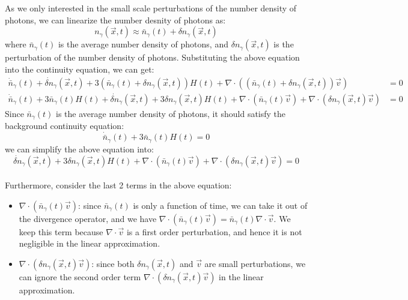 \bigskip \noindent
\begin{foundation}
    As we only interested in the small scale perturbations of the number density of photons, we can linearize the number desnity of photons as:
    \[
        n_\gamma(\vec{x},t) \approx \bar{n}_\gamma(t) + \delta n_\gamma(\vec{x},t)
    \]
    where $\bar{n}_\gamma(t)$ is the average number density of photons, and $\delta n_\gamma(\vec{x},t)$ is the perturbation of the number density of photons. Substituting the above equation into the continuity equation, we can get:
    \small
    \begin{align*}
        \dot{\bar{n}}_\gamma(t) + \dot{\delta n}_\gamma(\vec{x},t) + 3 (\bar{n}_\gamma(t) + \delta n_\gamma(\vec{x},t)) H(t) + \nabla \cdot ((\bar{n}_\gamma(t) + \delta n_\gamma(\vec{x},t)) \vec{v}) &= 0 \\
        \dot{\bar{n}}_\gamma(t) + 3 \bar{n}_\gamma(t) H(t) + \dot{\delta n}_\gamma(\vec{x},t)   + 3 \delta n_\gamma(\vec{x},t) H(t) + \nabla \cdot (\bar{n}_\gamma(t) \vec{v}) + \nabla \cdot (\delta n_\gamma(\vec{x},t) \vec{v}) &= 0
    \end{align*}
    \normalsize
    Since $\bar{n}_\gamma(t)$ is the average number density of photons, it should satisfy the background continuity equation:
    \[
        \dot{\bar{n}}_\gamma(t) + 3 \bar{n}_\gamma(t) H(t) = 0
    \]
    we can simplify the above equation into:
    \[
        \dot{\delta n}_\gamma(\vec{x},t) + 3 \delta n_\gamma(\vec{x},t) H(t) + \nabla \cdot (\bar{n}_\gamma(t) \vec{v}) + \nabla \cdot (\delta n_\gamma(\vec{x},t) \vec{v}) = 0 
    \] \\

    Furthermore, consider the last 2 terms in the above equation:
    \begin{itemize}
        \item $\nabla \cdot (\bar{n}_\gamma(t) \vec{v})$: since $\bar{n}_\gamma(t)$ is only a function of time, we can take it out of the divergence operator, and we have $\nabla \cdot (\bar{n}_\gamma(t) \vec{v}) = \bar{n}_\gamma(t) \nabla \cdot \vec{v}$. We keep this term because $\nabla \cdot \vec{v}$ is a first order perturbation, and hence it is not negligible in the linear approximation.
        \item $\nabla \cdot (\delta n_\gamma(\vec{x},t) \vec{v})$: since both $\delta n_\gamma(\vec{x},t)$ and $\vec{v}$ are small perturbations, we can ignore the second order term $\nabla \cdot (\delta n_\gamma(\vec{x},t) \vec{v})$ in the linear approximation.
    \end{itemize} \\


\end{foundation}
